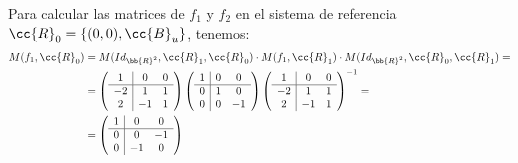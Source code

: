 \begin{ejercicio}
\begin{enumerate}
        Para calcular las matrices de $f_1$ y $f_2$ en el sistema de referencia $\cc{R}_0 = \{(0,0), \cc{B}_u\}$, tenemos:
        \begin{align*}
            M(f_1,\cc{R}_0) &= M(Id_{\bb{R}^2},\cc{R}_1,\cc{R}_0)\cdot M(f_1,\cc{R}_1) \cdot M(Id_{\bb{R}^2},\cc{R}_0,\cc{R}_1) =\\
            &= \left(\begin{array}{c|cc}
                1 & 0 & 0 \\ \hline
                -2 & 1 & 1 \\
                2 & -1 & 1
            \end{array}\right)
            \left(\begin{array}{c|cc}
                1 & 0 & 0 \\ \hline
                0 & 1 & 0 \\
                0 & 0 & -1
            \end{array}\right)
            \left(\begin{array}{c|cc}
                1 & 0 & 0 \\ \hline
                -2 & 1 & 1 \\
                2 & -1 & 1
            \end{array}\right)^{-1}
            =\\&= \left(\begin{array}{c|cc}
                1 & 0 & 0 \\ \hline
                0 & 0 & -1 \\
                0 & -1 & 0
            \end{array}\right)
        \end{align*}


\end{enumerate}
\end{ejercicio}
